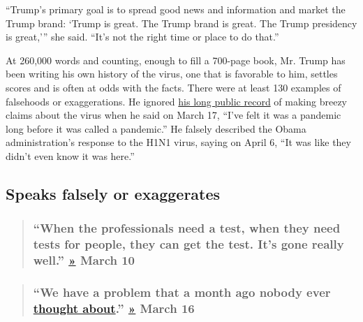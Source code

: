 ``Trump's primary goal is to spread good news and information and market
the Trump brand: `Trump is great. The Trump brand is great. The Trump
presidency is great,''' she said. ``It's not the right time or place to
do that.''

At 260,000 words and counting, enough to fill a 700-page book, Mr. Trump
has been writing his own history of the virus, one that is favorable to
him, settles scores and is often at odds with the facts. There were at
least 130 examples of falsehoods or exaggerations. He ignored
\href{https://www.nytimes3xbfgragh.onion/2020/03/27/us/politics/trump-coronavirus-factcheck.html}{his
long public record} of making breezy claims about the virus when he said
on March 17, ``I've felt it was a pandemic long before it was called a
pandemic.'' He falsely described the Obama administration's response to
the H1N1 virus, saying on April 6, ``It was like they didn't even know
it was here.''

\hypertarget{speaks-falsely-or-exaggerates}{%
\subsection{Speaks falsely or
exaggerates}\label{speaks-falsely-or-exaggerates}}

\begin{quote}
\hypertarget{when-the-professionals-need-a-test-when-they-need-tests-for-people-they-can-get-the-test-its-gone-really-well--march-10}{%
\subsubsection{\texorpdfstring{``When the professionals need a test,
when they need tests for people, they can get the test. It's gone really
well.''
\href{https://www.whitehouse.gov/briefings-statements/remarks-president-trump-meeting-republican-senators-2/}{»}
\textbf{March
10}}{``When the professionals need a test, when they need tests for people, they can get the test. It's gone really well.'' » March 10}}\label{when-the-professionals-need-a-test-when-they-need-tests-for-people-they-can-get-the-test-its-gone-really-well--march-10}}
\end{quote}

\begin{quote}
\hypertarget{we-have-a-problem-that-a-month-ago-nobody-ever-thought-about--march-16}{%
\subsubsection{\texorpdfstring{``We have a problem that a month ago
nobody ever
\href{https://www.nytimes3xbfgragh.onion/2020/04/11/us/politics/coronavirus-trump-response.html}{thought
about}.''
\href{https://www.whitehouse.gov/briefings-statements/remarks-president-trump-vice-president-pence-members-coronavirus-task-force-press-briefing-3/}{»}
\textbf{March
16}}{``We have a problem that a month ago nobody ever thought about.'' » March 16}}\label{we-have-a-problem-that-a-month-ago-nobody-ever-thought-about--march-16}}
\end{quote}

